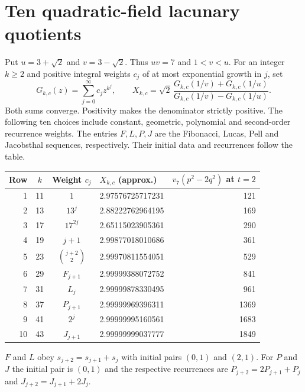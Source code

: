 \documentclass[11pt,a4paper]{article}
\begin{document}
\section{Ten quadratic-field lacunary quotients}\label{sec:tenpell}
Put $u=3+\sqrt2$ and $v=3-\sqrt2$. Thus $uv=7$ and $1<v<u$.
For an integer $k\ge2$ and positive integral weights $c_j$ of at most
exponential growth in $j$, set
\[
 G_{k,c}(z)=\sum_{j=0}^{\infty}c_jz^{k^j},\qquad
 X_{k,c}=\sqrt2\,
 \frac{G_{k,c}(1/v)+G_{k,c}(1/u)}{G_{k,c}(1/v)-G_{k,c}(1/u)} .
\]
Both sums converge. Positivity makes the denominator strictly positive.
The following ten choices include constant, geometric, polynomial and
second-order recurrence weights. The entries $F,L,P,J$ are the Fibonacci,
Lucas, Pell and Jacobsthal sequences, respectively. Their
initial data and recurrences follow the table.
\begin{center}\small
\begin{tabular}{@{}rccl r@{}}\toprule
Row & $k$ & Weight $c_j$ & $X_{k,c}$ (approx.) & $v_7(p^2-2q^2)$ at $t=2$\\\midrule
1 & 11 & $1$ & 2.97576725717231 & 121\\
2 & 13 & $13^j$ & 2.88222762964195 & 169\\
3 & 17 & $17^{2j}$ & 2.65115023905361 & 290\\
4 & 19 & $j+1$ & 2.99877018010686 & 361\\
5 & 23 & $\binom{j+2}{2}$ & 2.99970811554051 & 529\\
6 & 29 & $F_{j+1}$ & 2.99999388072752 & 841\\
7 & 31 & $L_j$ & 2.99999878330495 & 961\\
8 & 37 & $P_{j+1}$ & 2.99999969396311 & 1369\\
9 & 41 & $2^j$ & 2.99999995160561 & 1683\\
10 & 43 & $J_{j+1}$ & 2.99999999037777 & 1849\\
\bottomrule\end{tabular}\end{center}
$F$ and $L$ obey $s_{j+2}=s_{j+1}+s_j$ with initial pairs $(0,1)$
and $(2,1)$. For $P$ and $J$ the initial pair is $(0,1)$ and the
respective recurrences are $P_{j+2}=2P_{j+1}+P_j$ and
$J_{j+2}=J_{j+1}+2J_j$.
\end{document}
